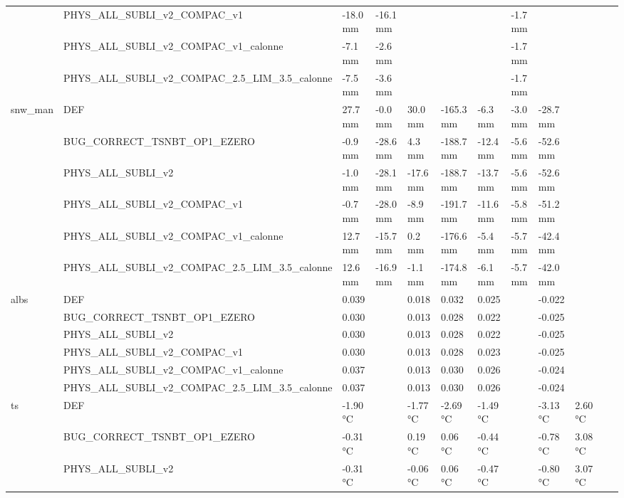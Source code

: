 \begin{tabular}{llllllllllll}
 & PHYS_ALL_SUBLI_v2_COMPAC_v1 & -18.0 mm & -16.1 mm &  &  &  & -1.7 mm &  &  &  &  \\
 & PHYS_ALL_SUBLI_v2_COMPAC_v1_calonne & -7.1 mm & -2.6 mm &  &  &  & -1.7 mm &  &  &  &  \\
 & PHYS_ALL_SUBLI_v2_COMPAC_2.5_LIM_3.5_calonne & -7.5 mm & -3.6 mm &  &  &  & -1.7 mm &  &  &  &  \\
\cline{1-12}
\multirow[t]{6}{*}{snw_man} & DEF & 27.7 mm & -0.0 mm & 30.0 mm & -165.3 mm & -6.3 mm & -3.0 mm & -28.7 mm &  &  &  \\
 & BUG_CORRECT_TSNBT_OP1_EZERO & -0.9 mm & -28.6 mm & 4.3 mm & -188.7 mm & -12.4 mm & -5.6 mm & -52.6 mm &  &  &  \\
 & PHYS_ALL_SUBLI_v2 & -1.0 mm & -28.1 mm & -17.6 mm & -188.7 mm & -13.7 mm & -5.6 mm & -52.6 mm &  &  &  \\
 & PHYS_ALL_SUBLI_v2_COMPAC_v1 & -0.7 mm & -28.0 mm & -8.9 mm & -191.7 mm & -11.6 mm & -5.8 mm & -51.2 mm &  &  &  \\
 & PHYS_ALL_SUBLI_v2_COMPAC_v1_calonne & 12.7 mm & -15.7 mm & 0.2 mm & -176.6 mm & -5.4 mm & -5.7 mm & -42.4 mm &  &  &  \\
 & PHYS_ALL_SUBLI_v2_COMPAC_2.5_LIM_3.5_calonne & 12.6 mm & -16.9 mm & -1.1 mm & -174.8 mm & -6.1 mm & -5.7 mm & -42.0 mm &  &  &  \\
\cline{1-12}
\multirow[t]{6}{*}{albs} & DEF & 0.039 &  & 0.018 & 0.032 & 0.025 &  & -0.022 &  &  &  \\
 & BUG_CORRECT_TSNBT_OP1_EZERO & 0.030 &  & 0.013 & 0.028 & 0.022 &  & -0.025 &  &  &  \\
 & PHYS_ALL_SUBLI_v2 & 0.030 &  & 0.013 & 0.028 & 0.022 &  & -0.025 &  &  &  \\
 & PHYS_ALL_SUBLI_v2_COMPAC_v1 & 0.030 &  & 0.013 & 0.028 & 0.023 &  & -0.025 &  &  &  \\
 & PHYS_ALL_SUBLI_v2_COMPAC_v1_calonne & 0.037 &  & 0.013 & 0.030 & 0.026 &  & -0.024 &  &  &  \\
 & PHYS_ALL_SUBLI_v2_COMPAC_2.5_LIM_3.5_calonne & 0.037 &  & 0.013 & 0.030 & 0.026 &  & -0.024 &  &  &  \\
\cline{1-12}
\multirow[t]{6}{*}{ts} & DEF & -1.90 °C &  & -1.77 °C & -2.69 °C & -1.49 °C &  & -3.13 °C & 2.60 °C &  &  \\
 & BUG_CORRECT_TSNBT_OP1_EZERO & -0.31 °C &  & 0.19 °C & 0.06 °C & -0.44 °C &  & -0.78 °C & 3.08 °C &  &  \\
 & PHYS_ALL_SUBLI_v2 & -0.31 °C &  & -0.06 °C & 0.06 °C & -0.47 °C &  & -0.80 °C & 3.07 °C &  &  \\

\end{tabular}
